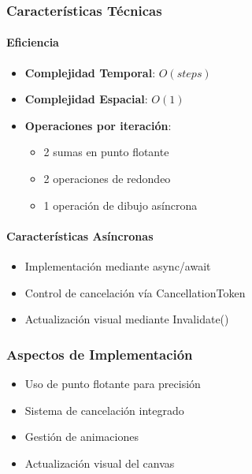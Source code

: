\documentclass[12pt]{article}
\begin{document}
\subsubsection{Características Técnicas}
\paragraph{Eficiencia}
\begin{itemize}
    \item \textbf{Complejidad Temporal}: $O(steps)$
    \item \textbf{Complejidad Espacial}: $O(1)$
    \item \textbf{Operaciones por iteración}:
    \begin{itemize}
        \item 2 sumas en punto flotante
        \item 2 operaciones de redondeo
        \item 1 operación de dibujo asíncrona
    \end{itemize}
\end{itemize}

\paragraph{Características Asíncronas}
\begin{itemize}
    \item Implementación mediante async/await
    \item Control de cancelación vía CancellationToken
    \item Actualización visual mediante Invalidate()
\end{itemize}

\subsubsection{Aspectos de Implementación}
\begin{itemize}
    \item Uso de punto flotante para precisión
    \item Sistema de cancelación integrado
    \item Gestión de animaciones
    \item Actualización visual del canvas
\end{itemize}
\end{document}
